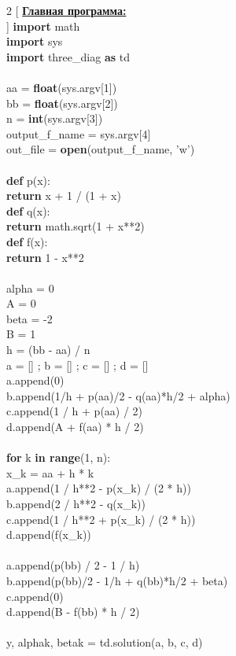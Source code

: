 \documentclass[a4paper,12pt]{report}
\begin{document}
\begin{multicols}{2}
[
\underline{\bf Главная программа:} \\
]
\noindent
{\bf import} math \\
{\bf import} sys \\
{\bf import} three\_diag {\bf as} td \\
\\
aa = {\bf float}(sys.argv[1]) \\
bb = {\bf float}(sys.argv[2]) \\
n = {\bf int}(sys.argv[3]) \\
output\_f\_name = sys.argv[4] \\
out\_file = {\bf open}(output\_f\_name, 'w') \\
\\
{\bf def} p(x): \\
\hspace*{2em}    {\bf return} x + 1 / (1 + x) \\
{\bf def} q(x): \\
\hspace*{2em}    {\bf return} math.sqrt(1 + x**2) \\
{\bf def} f(x): \\
\hspace*{2em}    {\bf return} 1 - x**2 \\
\\
alpha = 0 \\
A = 0 \\
beta = -2 \\
B = 1 \\
h = (bb - aa) / n \\
a = [] ;
b = [] ;
c = [] ;
d = [] \\
a.append(0) \\
b.append(1/h + p(aa)/2 - q(aa)*h/2 + alpha) \\
c.append(1 / h + p(aa) / 2) \\
d.append(A + f(aa) * h / 2) \\
\\
{\bf for} k {\bf in range}(1, n): \\
\hspace*{2em}    x\_k = aa + h * k \\
\hspace*{2em}    a.append(1 / h**2 - p(x\_k) / (2 * h)) \\
\hspace*{2em}    b.append(2 / h**2 - q(x\_k)) \\
\hspace*{2em}    c.append(1 / h**2 + p(x\_k) / (2 * h)) \\
\hspace*{2em}    d.append(f(x\_k)) \\
\\
a.append(p(bb) / 2 - 1 / h) \\
b.append(p(bb)/2 - 1/h + q(bb)*h/2 + beta) \\
c.append(0) \\
d.append(B - f(bb) * h / 2) \\
\\
y, alphak, betak = td.solution(a, b, c, d) \\
\end{multicols}
\end{document}
